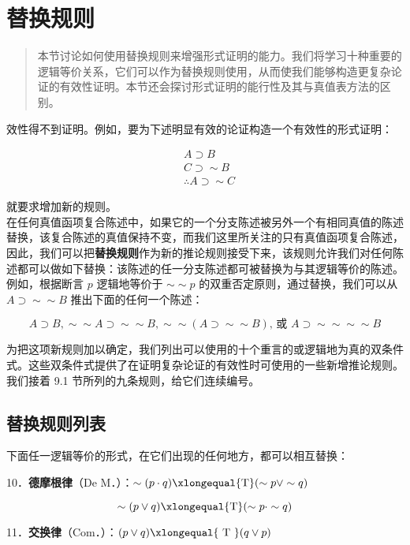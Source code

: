 \section{替换规则}

\begin{quotation}
本节讨论如何使用替换规则来增强形式证明的能力。我们将学习十种重要的逻辑等价关系，它们可以作为替换规则使用，从而使我们能够构造更复杂论证的有效性证明。本节还会探讨形式证明的能行性及其与真值表方法的区别。
\end{quotation}

效性得不到证明。例如，要为下述明显有效的论证构造一个有效性的形式证明：

$$
\begin{aligned}
& A \supset B \\
& C \supset \sim B \\
& \therefore A \supset \sim C
\end{aligned}
$$

就要求增加新的规则。\\
在任何真值函项复合陈述中，如果它的一个分支陈述被另外一个有相同真值的陈述替换，该复合陈述的真值保持不变，而我们这里所关注的只有真值函项复合陈述，因此，我们可以把\textbf{替换规则}作为新的推论规则接受下来，该规则允许我们对任何陈述都可以做如下替换：该陈述的任一分支陈述都可被替换为与其逻辑等价的陈述。例如，根据断言 $p$ 逻辑地等价于 $\sim \sim p$ 的双重否定原则，通过替换，我们可以从 $A \supset \sim \sim B$ 推出下面的任何一个陈述：

$$
A \supset B, \sim \sim A \supset \sim \sim B, \sim \sim(A \supset \sim \sim B) \text {, 或 } A \supset \sim \sim \sim \sim B
$$

为把这项新规则加以确定，我们列出可以使用的十个重言的或逻辑地为真的双条件式。这些双条件式提供了在证明复杂论证的有效性时可使用的一些新增推论规则。我们接着 9.1 节所列的九条规则，给它们连续编号。

\subsection{替换规则列表}

下面任一逻辑等价的形式，在它们出现的任何地方，都可以相互替换：

10．\textbf{德摩根律}（De M．）：$\sim(p \cdot q) \xlongequal{\mathrm{T}}(\sim p \vee \sim q)$

$$
\sim(p \vee q) \xlongequal{\mathrm{T}}(\sim p \cdot \sim q)
$$

11．\textbf{交换律}（Com．）：$(p \vee q) \xlongequal{\text { T }}(q \vee p)$


